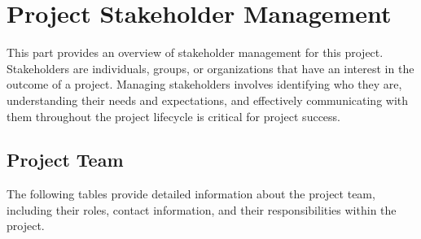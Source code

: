 \chapter{Project Stakeholder Management}

This part provides an overview of stakeholder management for this project. Stakeholders are individuals, groups, or organizations that have an interest in the outcome of a project. Managing stakeholders involves identifying who they are, understanding their needs and expectations, and effectively communicating with them throughout the project lifecycle is critical for project success.

\section{Project Team}

The following tables provide detailed information about the project team, including their roles, contact information, and their responsibilities within the project.


